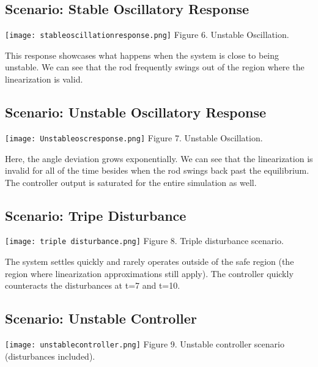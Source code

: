 \documentclass{article}
\begin{document}
\subsection{Scenario: Stable Oscillatory Response}

    \begin{center}
        \texttt{[image: stableoscillationresponse.png]}
        Figure 6. Unstable Oscillation. 
    \end{center}
    
    This response showcases what happens when the system is close to being unstable. We can see that the rod frequently swings out of the region where the linearization is valid.

\subsection{Scenario: Unstable Oscillatory Response}

    \begin{center}
        \texttt{[image: Unstableoscresponse.png]}
        Figure 7. Unstable Oscillation. 
    \end{center}
    
    Here, the angle deviation grows exponentially. We can see that the linearization is invalid for all of the time besides when the rod swings back past the equilibrium. The controller output is saturated for the entire simulation as well.
    
\subsection{Scenario: Tripe Disturbance}    
    \begin{center}
        \texttt{[image: triple disturbance.png]}
        Figure 8. Triple disturbance scenario.
    \end{center}
    
     The system settles quickly and rarely operates outside of the safe region (the region where linearization approximations still apply). The controller quickly counteracts the disturbances at t=7 and t=10.
    
    
\subsection{Scenario: Unstable Controller}
    \begin{center}
        \texttt{[image: unstablecontroller.png]}
        Figure 9. Unstable controller scenario (disturbances included).
    \end{center}
    
\end{document}

